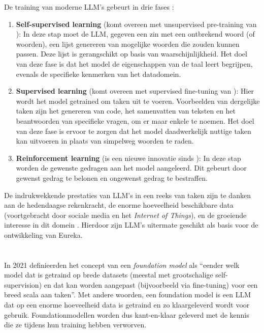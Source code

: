 De training van moderne \acrshort{LLM}'s gebeurt in drie fases \autocite{Bach2024}:
\begin{enumerate} 
    \item \textbf{Self-supervised learning} (komt overeen met unsupervised pre-training van \textcite{Radford2018}): In deze stap moet de LLM, gegeven een zin met een ontbrekend woord (of woorden), een lijst genereren van mogelijke woorden die zouden kunnen passen. Deze lijst is gerangschikt op basis van waarschijnlijkheid. Het doel van deze fase is dat het model de eigenschappen van de taal leert begrijpen, evenals de specifieke kenmerken van het datadomein.
    \item \textbf{Supervised learning} (komt overeen met supervised fine-tuning van \textcite{Radford2018}): Hier wordt het model getrained om taken uit te voeren. Voorbeelden van dergelijke taken zijn het genereren van code, het samenvatten van teksten en het beantwoorden van specifieke vragen, om er maar enkele te noemen. Het doel van deze fase is ervoor te zorgen dat het model daadwerkelijk nuttige taken kan uitvoeren in plaats van simpelweg woorden te raden.
    \item \textbf{Reinforcement learning} (is een nieuwe innovatie sinds \textcite{Radford2018}): In deze stap worden de gewenste gedragen aan het model aangeleerd. Dit gebeurt door gewenst gedrag te belonen en ongewenst gedrag te bestraffen.
\end{enumerate}

De indrukwekkende prestaties van \acrshort{LLM}'s in een reeks van taken \autocite{Naveed2023} zijn te danken aan de hedendaagse rekenkracht, de enorme hoeveelheid beschikbare data (voortgebracht door sociale media en het \emph{Internet of Things}), en de groeiende interesse in dit domein \autocite{Zohuri2022, Naveed2023}. Hierdoor zijn \acrshort{LLM}'s uitermate geschikt als basis voor de ontwikkeling van Eureka. 

\section{}%
\label{sec:ontwerp}

\subsection{}%
\label{subsec:specialiseren_llm}

In 2021 definieerden \textcite{Bommasani2021} het concept van een \emph{foundation model} als ``eender welk model dat is getraind op brede datasets (meestal met grootschalige self-supervision) en dat kan worden aangepast (bijvoorbeeld via fine-tuning) voor een breed scala aan taken''. Met andere woorden, een foundation model is een \acrshort{LLM} dat op een enorme hoeveelheid data is getraind en zo klaargeleverd wordt voor gebruik. Foundationmodellen worden dus kant-en-klaar geleverd met de kennis die ze tijdens hun training hebben verworven.

